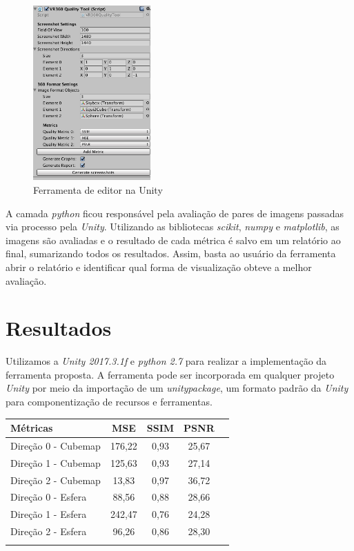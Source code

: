 \documentclass[conference]{IEEEtran}
\begin{document}
\begin{figure}[ht]
\centering
\includegraphics[width=0.4\textwidth]{../images/tool.png}
\caption{Ferramenta de editor na Unity}
\label{fig:unity_tool}
\end{figure}

A camada \textit{python} ficou responsável pela avaliação de pares de imagens passadas via processo pela \textit{Unity}. Utilizando as bibliotecas \textit{scikit}, \textit{numpy} e \textit{matplotlib}, as imagens são avaliadas e o resultado de cada métrica é salvo em um relatório ao final, sumarizando todos os resultados. Assim, basta ao usuário da ferramenta abrir o relatório e identificar qual forma de visualização obteve a melhor avaliação.

\section{Resultados}  \label{sec:results}

Utilizamos a \textit{Unity 2017.3.1f} e \textit{python 2.7} para realizar a implementação da ferramenta proposta. A ferramenta pode ser incorporada em qualquer projeto \textit{Unity} por meio da importação de um \textit{unitypackage}, um formato padrão da \textit{Unity} para componentização de recursos e ferramentas.

\begin{tabular}{l*{3}{c}r}
Métricas          & MSE & SSIM & PSNR \\
\hline
Direção 0 - Cubemap & 176,22 & 0,93 & 25,67 \\
Direção 1 - Cubemap & 125,63 & 0,93 & 27,14 \\
Direção 2 - Cubemap & 13,83 & 0,97 & 36,72 \\
Direção 0 - Esfera  & 88,56 & 0,88 & 28,66 \\
Direção 1 - Esfera  & 242,47 & 0,76 & 24,28 \\
Direção 2 - Esfera  & 96,26 & 0,86 & 28,30 \\
\label{tab:metrics_results}
\end{tabular}
\end{document}
